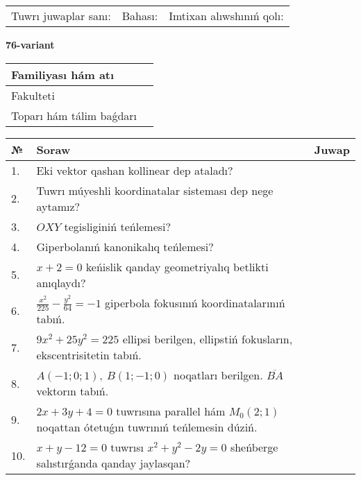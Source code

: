 \documentclass{article}
\begin{document}
\vspace{1cm}

\begin{tabular}{lll}
Tuwrı juwaplar sanı: \underline{\hspace{1.5cm}} & 
Bahası: \underline{\hspace{1.5cm}} & 
Imtixan alıwshınıń qolı: \underline{\hspace{2cm}} \\
\end{tabular}

\egroup

\newpage


\textbf{76-variant}\\

\bgroup
\def\arraystretch{1.6} %

\begin{tabular}{|m{5.7cm}|m{9.5cm}|}
\hline
Familiyası hám atı & \\
\hline
Fakulteti  & \\
\hline
Toparı hám tálim baǵdarı  & \\
\hline
\end{tabular}

\vspace{1cm}

\begin{tabular}{|m{0.7cm}|m{10cm}|m{4cm}|}
\hline
№ & Soraw & Juwap \\
\hline
1. & Eki vektor qashan kollinear dep ataladı? &  \\
\hline
2. & Tuwrı múyeshli koordinatalar sisteması dep nege aytamız? &  \\
\hline
3. & $OXY$ tegisliginiń teńlemesi? &  \\
\hline
4. & Giperbolanıń kanonikalıq teńlemesi? &  \\
\hline
5. & $x+2=0$ keńislik qanday geometriyalıq betlikti anıqlaydı? &  \\
\hline
6. & $\frac{x^{2}}{225}-\frac{y^{2}}{64}=-1$ giperbola fokusınıń koordinatalarınıń tabıń. &  \\
\hline
7. & $9x^{2}+25y^{2}=225$ ellipsi berilgen, ellipstiń fokusların, ekscentrisitetin tabıń. &  \\
\hline
8. & $A (-1;0;1),\ B (1;-1;0)$ noqatları berilgen. $\overline{BA}$ vektorın tabıń. &  \\
\hline
9. & $2x+3y+4=0$ tuwrısına parallel hám $M_{0} (2;1)$ noqattan ótetuǵın tuwrınıń teńlemesin dúziń. &  \\
\hline
10. & $x+y-12=0$ tuwrısı $x^{2}+y^{2}-2y=0$ sheńberge salıstırǵanda qanday jaylasqan? &  \\
\hline
\end{tabular}
\end{document}
